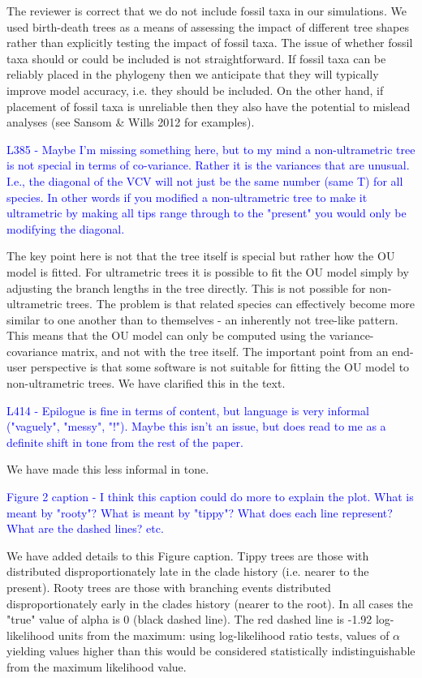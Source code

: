\documentclass[12pt]{letter}
\begin{document}
\begin{letter}{}
The reviewer is correct that we do not include fossil taxa in our simulations. We used birth-death trees as a means of assessing the impact of different tree shapes rather than explicitly testing the impact of fossil taxa. The issue of whether fossil taxa should or could be included is not straightforward. If fossil taxa can be reliably placed in the phylogeny then we anticipate that they will typically improve model accuracy, i.e. they should be included. On the other hand, if placement of fossil taxa is unreliable then they also have the potential to mislead analyses (see Sansom \& Wills 2012 for examples).

\textcolor{blue}{L385 - Maybe I'm missing something here, but to my mind a non-ultrametric tree is not special in terms of co-variance. Rather it is the variances that are unusual. I.e., the diagonal of the VCV will not just be the same number (same T) for all species. In other words if you modified a non-ultrametric tree to make it ultrametric by making all tips range through to the "present" you would only be modifying the diagonal.}

The key point here is not that the tree itself is special but rather how the OU model is fitted. For ultrametric trees it is possible to fit the OU model simply by adjusting the branch lengths in the tree directly. This is not possible for non-ultrametric trees. The problem is that related species can effectively become more similar to one another than to themselves - an inherently not tree-like pattern. This means that the OU model can only be computed using the variance-covariance matrix, and not with the tree itself. The important point from an end-user perspective is that some software is not suitable for fitting the OU model to non-ultrametric trees. We have clarified this in the text.

\textcolor{blue}{L414 - Epilogue is fine in terms of content, but language is very informal ("vaguely", "messy", "!"). Maybe this isn't an issue, but does read to me as a definite shift in tone from the rest of the paper.}

We have made this less informal in tone.

\textcolor{blue}{Figure 2 caption - I think this caption could do more to explain the plot. What is meant by "rooty"? What is meant by "tippy"? What does each line represent? What are the dashed lines? etc.}

We have added details to this Figure caption. Tippy trees are those with distributed disproportionately late in the clade history (i.e. nearer to the present). Rooty trees are those with branching events distributed disproportionately early in the clades history (nearer to the root). In all cases the "true" value of alpha is 0 (black dashed line). The red dashed line is -1.92 log-likelihood units from the maximum: using log-likelihood ratio tests, values of $\alpha$ yielding values higher than this would be considered statistically indistinguishable from the maximum likelihood value.  


\end{letter}
\end{document}
